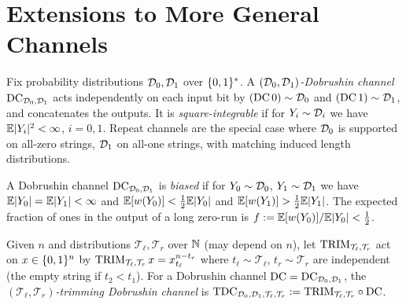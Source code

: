 \chapter{Extensions to More General Channels}

\begin{definition}
  \label{def:dobrushin}
  Fix probability distributions $\mathcal{D}_0,\mathcal{D}_1$ over $\{0,1\}^*$. A
  \emph{$(\mathcal{D}_0,\mathcal{D}_1)$-Dobrushin channel} $\mathrm{DC}_{\mathcal{D}_0,\mathcal{D}_1}$ acts
  independently on each input bit by $(\mathrm{DC}\,0)\sim\mathcal{D}_0$ and
  $(\mathrm{DC}\,1)\sim\mathcal{D}_1$, and concatenates the outputs. It is
  \emph{square-integrable} if for $Y_i\sim\mathcal{D}_i$ we have $\mathbb{E}|Y_i|^2<\infty$,
  $i=0,1$. Repeat channels are the special case where $\mathcal{D}_0$ is supported on
  all-zero strings, $\mathcal{D}_1$ on all-one strings, with matching induced length
  distributions.
\end{definition}

\begin{definition}
  \label{def:biased-dobrushin}
  A Dobrushin channel $\mathrm{DC}_{\mathcal{D}_0,\mathcal{D}_1}$ is \emph{biased} if for
  $Y_0\sim\mathcal{D}_0$, $Y_1\sim\mathcal{D}_1$ we have $\mathbb{E}|Y_0|=\mathbb{E}|Y_1|<\infty$ and
  $\mathbb{E}[w(Y_0)]<\tfrac12\mathbb{E}|Y_0|$ and $\mathbb{E}[w(Y_1)]>\tfrac12\mathbb{E}|Y_1|$. The
  expected fraction of ones in the output of a long zero-run is
  $f:=\mathbb{E}[w(Y_0)]/\mathbb{E}|Y_0|<\tfrac12$.
\end{definition}

\begin{definition}
  \label{def:trim-dobrushin}
  Given $n$ and distributions $\mathcal{T}_\ell,\mathcal{T}_r$ over $\mathbb{N}$ (may
  depend on $n$), let $\mathrm{TRIM}_{\mathcal{T}_\ell,\mathcal{T}_r}$ act on $x\in\{0,1\}^n$
  by $\mathrm{TRIM}_{\mathcal{T}_\ell,\mathcal{T}_r}\,x=x_{t_\ell}^{n-t_r}$ where
  $t_\ell\sim\mathcal{T}_\ell$, $t_r\sim\mathcal{T}_r$ are independent (the empty
  string if $t_2<t_1$). For a Dobrushin channel
  $\mathrm{DC}=\mathrm{DC}_{\mathcal{D}_0,\mathcal{D}_1}$, the
  \emph{$(\mathcal{T}_\ell,\mathcal{T}_r)$-trimming Dobrushin channel} is
  $\mathrm{TDC}_{\mathcal{D}_0,\mathcal{D}_1,\mathcal{T}_\ell,\mathcal{T}_r}
   :=\mathrm{TRIM}_{\mathcal{T}_\ell,\mathcal{T}_r}\circ\mathrm{DC}$.
\end{definition}

